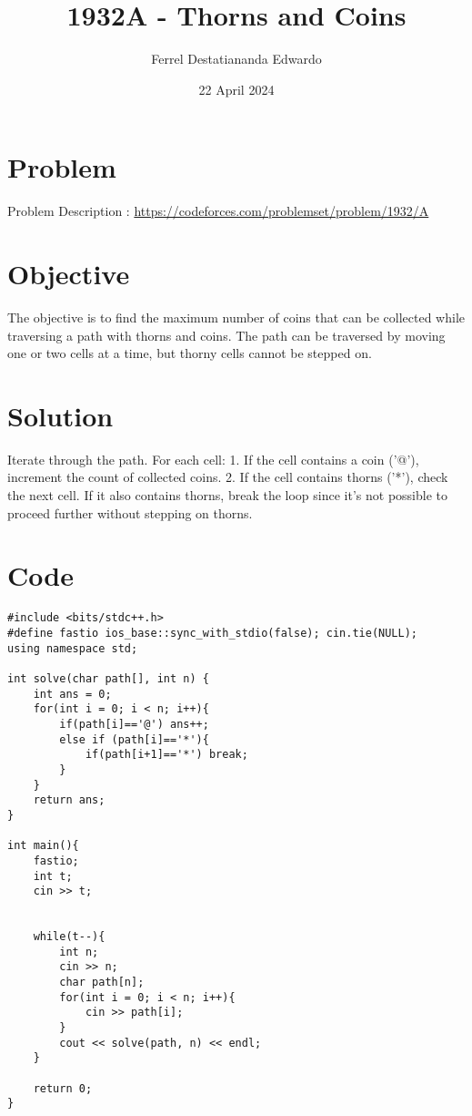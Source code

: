 \documentclass{article}
\title{1932A - Thorns and Coins}
\author{Ferrel Destatiananda Edwardo}
\date{22 April 2024}
\begin{document}
\maketitle


\section{Problem}

Problem Description : \href{https://codeforces.com/problemset/problem/1932/A}{https://codeforces.com/problemset/problem/1932/A}

\section{Objective}

The objective is to find the maximum number of coins that can be collected while traversing a path with thorns and coins. The path can be traversed by moving one or two cells at a time, but thorny cells cannot be stepped on.

\section{Solution}

Iterate through the path. For each cell: 1. If the cell contains a coin ('@'), increment the count of collected coins. 2. If the cell contains thorns ('*'), check the next cell. If it also contains thorns, break the loop since it's not possible to proceed further without stepping on thorns.


\newpage
\section{Code}

\begin{lstlisting}
#include <bits/stdc++.h>
#define fastio ios_base::sync_with_stdio(false); cin.tie(NULL);
using namespace std;

int solve(char path[], int n) {
    int ans = 0;
    for(int i = 0; i < n; i++){
        if(path[i]=='@') ans++;
        else if (path[i]=='*'){
            if(path[i+1]=='*') break;
        }
    }
    return ans;
}

int main(){
    fastio;
    int t;
    cin >> t;


    while(t--){
        int n;
        cin >> n;
        char path[n];
        for(int i = 0; i < n; i++){
            cin >> path[i];
        }
        cout << solve(path, n) << endl;
    }

    return 0;
}

\end{lstlisting}
\end{document}
